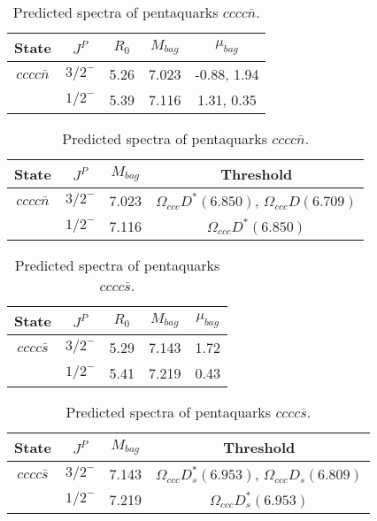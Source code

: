 \documentclass[prd,twocolumn,floatfix,nofootinbib]{revtex4}
\begin{document}
\renewcommand{\tabcolsep}{0.5cm}
\renewcommand{\arraystretch}{1.2}
\begin{table*}[!htbp]
    \caption{Predicted spectra of pentaquarks $cccc\bar{n}$.}
    \begin{tabular}{ccccc}
        \hline\hline
        {\rm State} &$J^{P}$ &$R_{0}$ &$M_{bag}$ &$\mu_{bag}$ \\ \hline
        ${cccc\bar{n}}$
            &${3/2}^{-}$    &5.26   &7.023  &-0.88, 1.94 \\
            &${1/2}^{-}$    &5.39   &7.116  &1.31, 0.35 \\
        \hline\hline
    \end{tabular}
\end{table*}

\renewcommand{\tabcolsep}{0.5cm}
\renewcommand{\arraystretch}{1.2}
\begin{table*}[!htbp]
    \caption{Predicted spectra of pentaquarks $cccc\bar{n}$.}
    \begin{tabular}{cccc}
        \hline\hline
        {\rm State} &$J^{P}$ &$M_{bag}$ &Threshold \\ \hline
        ${cccc\bar{n}}$
            &${3/2}^{-}$    &7.023  &$\Omega_{ccc} D^{\ast}(6.850)$, $\Omega_{ccc} D(6.709)$ \\
            &${1/2}^{-}$    &7.116  &$\Omega_{ccc} D^{\ast}(6.850)$ \\
        \hline\hline
    \end{tabular}
\end{table*}

\renewcommand{\tabcolsep}{0.5cm}
\renewcommand{\arraystretch}{1.2}
\begin{table*}[!htbp]
    \caption{Predicted spectra of pentaquarks $cccc\bar{s}$.}
    \begin{tabular}{ccccc}
        \hline\hline
        {\rm State} &$J^{P}$ &$R_{0}$ &$M_{bag}$ &$\mu_{bag}$ \\ \hline
        ${cccc\bar{s}}$
            &${3/2}^{-}$    &5.29   &7.143  &1.72 \\
            &${1/2}^{-}$    &5.41   &7.219  &0.43 \\
        \hline\hline
    \end{tabular}
\end{table*}

\renewcommand{\tabcolsep}{0.5cm}
\renewcommand{\arraystretch}{1.2}
\begin{table*}[!htbp]
    \caption{Predicted spectra of pentaquarks $cccc\bar{s}$.}
    \begin{tabular}{cccc}
        \hline\hline
        {\rm State} &$J^{P}$ &$M_{bag}$ &Threshold \\ \hline
        ${cccc\bar{s}}$
            &${3/2}^{-}$    &7.143  &$\Omega_{ccc} D^{\ast}_{s}(6.953)$, $\Omega_{ccc} D_{s}(6.809)$ \\
            &${1/2}^{-}$    &7.219  &$\Omega_{ccc} D^{\ast}_{s}(6.953)$ \\
        \hline\hline
    \end{tabular}
\end{table*}
\end{document}
